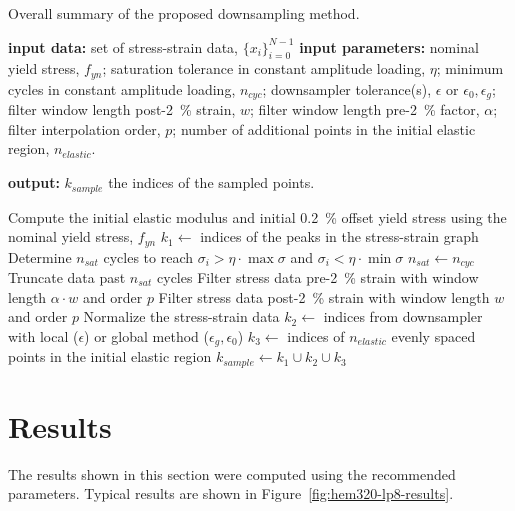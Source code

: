 \documentclass[a4paper,11pt]{article}
\begin{document}
\begin{algorithm}
	\caption{Overall summary of the proposed downsampling method.}
	\label{alg:overall-summary}
	\begin{algorithmic}[1]
        \State \textbf{input data:} set of stress-strain data, $\{x_i\}_{i=0}^{N-1}$
        \State \textbf{input parameters:} nominal yield stress, $f_{yn}$; saturation tolerance in constant amplitude loading, $\eta$; minimum cycles in constant amplitude loading, $n_{cyc}$; downsampler tolerance(s), $\epsilon$ or $\epsilon_0, \epsilon_g$; filter window length post-2~\% strain, $w$; filter window length pre-2~\% factor, $\alpha$; filter interpolation order, $p$; number of additional points in the initial elastic region, $n_{elastic}$.

        \State \textbf{output:} $k_{sample}$ the indices of the sampled points.
        \bigskip

        \State Compute the initial elastic modulus and initial 0.2~\% offset yield stress using the nominal yield stress, $f_{yn}$
        \State $k_{1} \gets $ indices of the peaks in the stress-strain graph
            \State Determine $n_{sat}$ cycles to reach $\sigma_i > \eta \cdot \max \sigma$ and $\sigma_i < \eta \cdot \min \sigma$
                \State $n_{sat} \gets n_{cyc}$
            \EndIf
            \State Truncate data past $n_{sat}$ cycles
        \EndIf
        \State Filter stress data pre-2~\% strain with window length $\alpha \cdot w$ and order $p$
        \State Filter stress data post-2~\% strain with window length $w$ and order $p$
        \State Normalize the stress-strain data
        \State $k_2 \gets$ indices from downsampler with local ($\epsilon$) or global method ($\epsilon_g, \epsilon_0$) \label{algline:downsampler}
        \State $k_3 \gets$ indices of $n_{elastic}$ evenly spaced points in the initial elastic region
        \State $k_{sample} \gets k_1 \cup k_2 \cup k_3$
    \end{algorithmic}
\end{algorithm}



\section{Results}

The results shown in this section were computed using the recommended parameters.
Typical results are shown in Figure~\ref{fig:hem320-lp8-results}.
\end{document}
